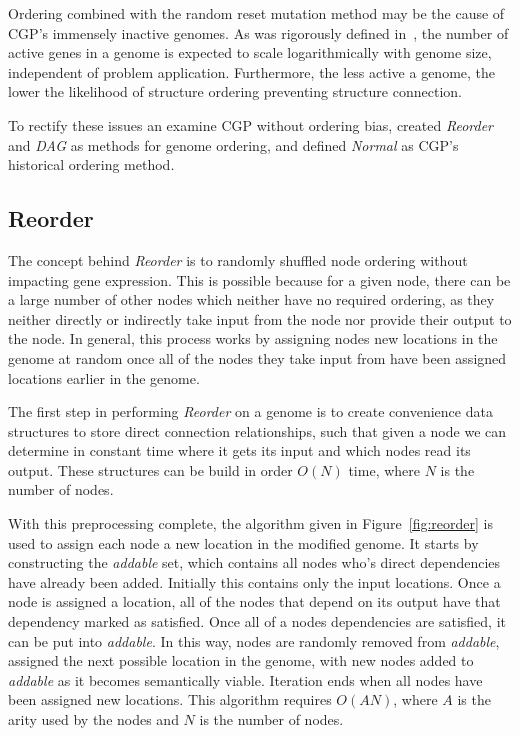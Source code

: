 \documentclass[journal]{IEEEtran}
\begin{document}
Ordering combined with the random reset mutation method may be the cause of CGP's
immensely inactive genomes.  As was rigorously defined in~\cite{goldman:2013:ordering},
the number of active genes in a genome is expected to scale logarithmically
with genome size, independent of problem application.  Furthermore, the less
active a genome, the lower the likelihood of structure ordering preventing structure
connection.

To rectify these issues an examine CGP without ordering bias, \cite{goldman:2013:ordering}
created \emph{Reorder} and \emph{DAG} as methods for genome ordering, and defined
\emph{Normal} as CGP's historical ordering method.

\subsection{Reorder}
\label{sec:reorder}
The concept behind \emph{Reorder} is to randomly shuffled node ordering without
impacting gene expression.  This is possible because for a given node, there can
be a large number of other nodes which neither have no required ordering,
as they neither directly or indirectly take input from the node nor provide their
output to the node.  In general, this process works by assigning nodes new
locations in the genome at random once all of the nodes they take input from have been assigned
locations earlier in the genome.

The first step in performing \emph{Reorder} on a genome is to create convenience
data structures to store direct connection relationships, such that given a node
we can determine in constant time where it gets its input and which nodes read
its output.  These structures can be build in order $O(N)$ time, where $N$ is the
number of nodes.

With this preprocessing complete, the algorithm given in Figure~\ref{fig:reorder}
is used to assign each node a new location in the modified genome.
It starts by constructing the \emph{addable} set, which contains all nodes who's direct
dependencies have already been added.  Initially this contains only the input locations.
Once a node is assigned a location, all of the nodes that depend on its output
have that dependency marked as satisfied.  Once all of a nodes dependencies
are satisfied, it can be put into \emph{addable}.  In this way, nodes are
randomly removed from \emph{addable}, assigned the next possible location
in the genome, with new nodes added to \emph{addable} as it becomes semantically
viable.  Iteration ends when all nodes have been assigned new locations.
This algorithm requires $O(AN)$, where $A$ is the arity used by the nodes
and $N$ is the number of nodes.
\end{document}

